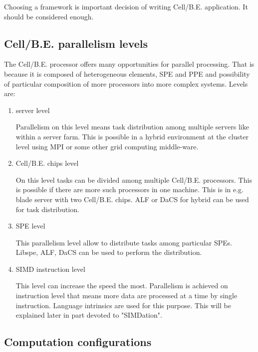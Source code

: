 Choosing a framework is important decision of writing \mbox{Cell/B.E.} application.
It should be considered enough.

\subsection {\mbox{Cell/B.E.} parallelism levels}

The \mbox{Cell/B.E.} processor offers many opportunities for parallel processing.
That is because it is composed of heterogeneous elements, SPE and PPE and possibility of particular composition of more processors into more complex systems.
 Levels are:
\begin{enumerate}
\item server level
\par
Parallelism on this level means task distribution among multiple servers like within a server farm.
This is possible in a hybrid environment at the cluster level using MPI or some other grid computing middle-ware.

\item \mbox{Cell/B.E.} chips level
\par
On this level tasks can be divided among multiple \mbox{Cell/B.E.} processors.
This is possible if there are more such processors in one machine.
This is in e.g. blade server with two \mbox{Cell/B.E.} chips.
ALF or DaCS for hybrid can be used for task distribution.

\item SPE level
\par
This parallelism level allow to distribute tasks among particular SPEs.
Libspe, ALF, DaCS can be used to perform the distribution.

\item SIMD instruction level
\par
This level can increase the speed the most.
Parallelism is achieved on instruction level that means more data are processed at a time by single instruction.
Language intrinsics are used for this purpose.
This will be explained later in part devoted to "SIMDation".
\end{enumerate}

\subsection{Computation configurations}

